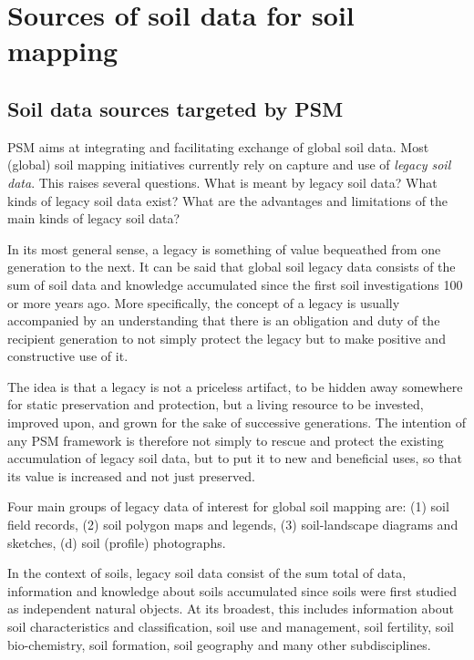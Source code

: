 \documentclass[11pt]{krantz}
\makeatletter
\newenvironment{kframe}{%
\medskip{}
\setlength{\fboxsep}{.8em}
 \def\at@end@of@kframe{}%
 \ifinner\ifhmode%
  \def\at@end@of@kframe{\end{minipage}}%
  \begin{minipage}{\columnwidth}%
 \fi\fi%
 \def\FrameCommand##1{\hskip\@totalleftmargin \hskip-\fboxsep
 \colorbox{shadecolor}{##1}\hskip-\fboxsep
     \hskip-\linewidth \hskip-\@totalleftmargin \hskip\columnwidth}%
 \MakeFramed {\advance\hsize-\width
   \@totalleftmargin\z@ \linewidth\hsize
   \@setminipage}}%
 {\par\unskip\endMakeFramed%
 \at@end@of@kframe}
\newenvironment{rmdblock}[1]
  {
  \begin{itemize}
  \renewcommand{\labelitemi}{
    \raisebox{-.7\height}[0pt][0pt]{
      {\setkeys{Gin}{width=3em,keepaspectratio}\texttt{[image: images/\#1]}}
    }
  }
  \setlength{\fboxsep}{1em}
  \begin{kframe}
  \item
  }
  {
  \end{kframe}
  \end{itemize}
  }
\newenvironment{rmdnote}
  {\begin{rmdblock}{note}}
  {\end{rmdblock}}
\theoremstyle{definition}
\theoremstyle{definition}
\theoremstyle{definition}
\theoremstyle{remark}
\makeatother
\begin{document}
\hypertarget{sources-of-soil-data-for-soil-mapping}{%
\section{Sources of soil data for soil
mapping}\label{sources-of-soil-data-for-soil-mapping}}

\hypertarget{soil-data-sources-targeted-by-psm}{%
\subsection{Soil data sources targeted by
PSM}\label{soil-data-sources-targeted-by-psm}}

PSM aims at integrating and facilitating exchange of global soil data.
Most (global) soil mapping initiatives currently rely on capture and use
of \emph{legacy soil data}. This raises several questions. What is meant
by legacy soil data? What kinds of legacy soil data exist? What are the
advantages and limitations of the main kinds of legacy soil data?

In its most general sense, a legacy is something of value bequeathed
from one generation to the next. It can be said that global soil legacy
data consists of the sum of soil data and knowledge accumulated since
the first soil investigations 100 or more years ago. More specifically,
the concept of a legacy is usually accompanied by an understanding that
there is an obligation and duty of the recipient generation to not
simply protect the legacy but to make positive and constructive use of
it.

The idea is that a legacy is not a priceless artifact, to be hidden away
somewhere for static preservation and protection, but a living resource
to be invested, improved upon, and grown for the sake of successive
generations. The intention of any PSM framework is therefore not simply
to rescue and protect the existing accumulation of legacy soil data, but
to put it to new and beneficial uses, so that its value is increased and
not just preserved.

\begin{rmdnote}
Four main groups of legacy data of interest for global soil mapping are:
(1) soil field records, (2) soil polygon maps and legends, (3)
soil-landscape diagrams and sketches, (d) soil (profile) photographs.
\end{rmdnote}

In the context of soils, legacy soil data consist of the sum total of
data, information and knowledge about soils accumulated since soils were
first studied as independent natural objects. At its broadest, this
includes information about soil characteristics and classification, soil
use and management, soil fertility, soil bio-chemistry, soil formation,
soil geography and many other subdisciplines.
\end{document}
